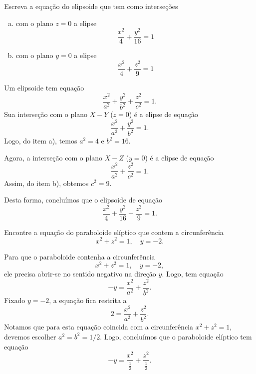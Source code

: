 \begin{exeresol}
  Escreva a equação do elipsoide que tem como interseções
  \begin{enumerate}[a)]
  \item com o plano $z=0$ a elipse
    \begin{equation}
      \frac{x^2}{4}+\frac{y^2}{16} = 1
    \end{equation}
  \item com o plano $y=0$ a elipse
    \begin{equation}
      \frac{x^2}{4}+\frac{z^2}{9} = 1
    \end{equation}
  \end{enumerate}
\end{exeresol}
\begin{resol}
  Um elipsoide tem equação
  \begin{equation}
    \frac{x^2}{a^2}+\frac{y^2}{b^2}+\frac{z^2}{c^2}=1.
  \end{equation}
  Sua interseção com o plano $X-Y$ ($z=0$) é a elipse de equação
  \begin{equation}
    \frac{x^2}{a^2}+\frac{y^2}{b^2}=1.
  \end{equation}
  Logo, do item a), temos $a^2=4$ e $b^2=16$.

  Agora, a interseção com o plano $X-Z$ ($y=0$) é a elipse de equação
  \begin{equation}
    \frac{x^2}{a^2}+\frac{z^2}{c^2}=1.
  \end{equation}
  Assim, do item b), obtemos $c^2=9$.

  Desta forma, concluímos que o elipsoide de equação
  \begin{equation}
    \frac{x^2}{4}+\frac{y^2}{16}+\frac{z^2}{9}=1.
  \end{equation}
\end{resol}

\begin{exeresol}
  Encontre a equação do paraboloide elíptico que contem a circunferência
  \begin{equation}
    x^2+z^2=1,\quad y=-2.
  \end{equation}
\end{exeresol}
\begin{resol}
  Para que o paraboloide contenha a circunferência
  \begin{equation}
    x^2+z^2=1,\quad y=-2,
  \end{equation}
  ele precisa abrir-se no sentido negativo na direção $y$. Logo, tem equação
  \begin{equation}
    -y = \frac{x^2}{a^2}+\frac{z^2}{b^2}.
  \end{equation}
  Fixado $y=-2$, a equação fica restrita a
  \begin{equation}
    2  = \frac{x^2}{a^2}+\frac{z^2}{b^2}.
  \end{equation}
  Notamos que para esta equação coincida com a circunferência $x^2+z^2=1$, devemos escolher $a^2=b^2=1/2$. Logo, concluímos que o paraboloide elíptico tem equação
  \begin{equation}
    -y = \frac{x^2}{\frac{1}{2}}+\frac{z^2}{\frac{1}{2}}.
  \end{equation}
\end{resol}

